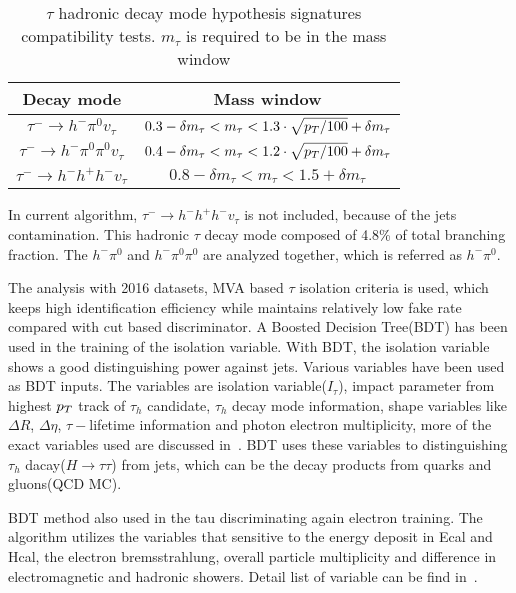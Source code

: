 \begin{table}[htp]
\caption{$\tau$ hadronic decay mode hypothesis signatures compatibility tests. $m_{\tau}$ is required to be in the mass window }\label{tb:tauHdecayRecomass}
\begin{center}
\begin{tabular}{|c|c|}
\hline
Decay mode                                             & Mass window\\\hline
$\tau^{-}\to h^{-}\pi^{0} v_{\tau}$                       & $0.3-\delta m_{\tau}<m_{\tau}<1.3\cdot \sqrt{p_{T}/100}+\delta m_{\tau}$      \\\hline
$\tau^{-}\to h^{-}\pi^{0} \pi^{0}  v_{\tau}$       &  $0.4-\delta m_{\tau}<m_{\tau}<1.2\cdot \sqrt{p_{T}/100}+\delta m_{\tau}$   \\\hline
$\tau^{-}\to h^{-}h^{+}h^{-}v_{\tau}$                     & $0.8-\delta m_{\tau}<m_{\tau}<1.5+\delta m_{\tau}$   \\\hline
 \end{tabular}
\end{center}
\end{table}

In current algorithm, $\tau^{-}\to h^{-}h^{+}h^{-}v_{\tau}$ is not included, because of the jets contamination. This hadronic $\tau$ decay mode composed of 4.8\% of total branching fraction. The $h^{-}\pi^{0}$ and $h^{-}\pi^{0}\pi^{0}$ are analyzed together, which is referred as $h^{-}\pi^{0}$.

The analysis with 2016 datasets, MVA based $\tau$ isolation criteria is used, which keeps high identification efficiency while maintains relatively low fake rate compared with cut based discriminator. A Boosted Decision Tree(BDT) has been used in the training of the isolation variable. With BDT, the isolation variable shows a good distinguishing power against jets. Various variables have been used as BDT inputs. The variables are isolation variable($I_{\tau}$), impact parameter from highest $p_{T}$ track of $\tau_{h}$ candidate, $\tau_{h}$ decay mode information, shape variables like $\Delta R$, $\Delta \eta$, $\tau-$lifetime information and photon electron multiplicity, more of the exact variables used are discussed in~\cite{TauRecoandIDRunII,TauReconstuction}. BDT uses these variables to distinguishing $\tau_{h}$ dacay($H \to \tau \tau$) from jets, which can be the decay products from quarks and gluons(QCD MC).  

BDT method also used in the tau discriminating again electron training. The algorithm utilizes the variables that sensitive to the energy deposit in Ecal and Hcal, the electron bremsstrahlung, overall particle multiplicity and difference in electromagnetic and hadronic showers. Detail list of variable can be find in~\cite{TauRecoandIDRunII,TauReconstuction}.

